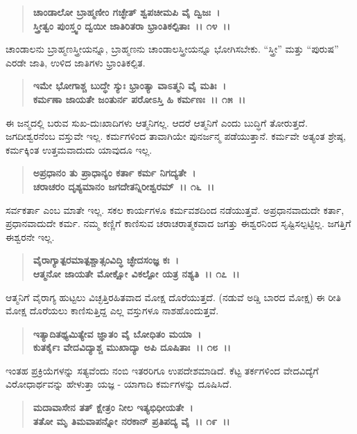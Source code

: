 \begin{verse}
\textbf{ಚಾಂಡಾಲೋ ಬ್ರಾಹ್ಮಣೀಂ ಗಚ್ಛೇತ್ ಶ್ವಪಚೀಮಪಿ ವೈ ದ್ವಿಜಃ~।}\\\textbf{ಸ್ತ್ರೀತ್ವಂ ಪುಂಸ್ತ್ವಂ ದ್ವಯೀ ಜಾತಿರಿತರಾ ಭ್ರಾಂತಿಕಲ್ಪಿತಾಃ~।। ೧೪~।।}
\end{verse}

ಚಾಂಡಾಲನು ಬ್ರಾಹ್ಮಣಸ್ತ್ರೀಯನ್ನೂ, ಬ್ರಾಹ್ಮಣನು ಚಾಂಡಾಲಸ್ತ್ರೀಯನ್ನೂ ಭೋಗಿಸಬೇಕು. “ಸ್ತ್ರೀ” ಮತ್ತು “ಪುರುಷ” ಎರಡೇ ಜಾತಿ, ಉಳಿದ ಜಾತಿಗಳು ಭ್ರಾಂತಿಕಲ್ಪಿತ.

\begin{verse}
\textbf{ಇಮೇ ಭೋಗಾಶ್ಚ ಬುದ್ಧೇ ಸ್ಯುಃ ಭ್ರಾಂತ್ಯಾ ವಾಽತ್ಮನಿ ವೈ ಮತಿಃ~।}\\\textbf{ಕರ್ಮಣಾ ಜಾಯತೇ ಜಂತುರ್ನ ಪರೋಽಸ್ತಿ ಹಿ ಕರ್ಮಣಃ~।। ೧೫~।।}
\end{verse}

ಈ ಜನ್ಮದಲ್ಲಿ ಬರುವ ಸುಖ-ದುಃಖಾದಿಗಳು ಆತ್ಮನಿಗಲ್ಲ. ಆದರೆ ಆತ್ಮನಿಗೆ ಎಂದು ಬುದ್ಧಿಗೆ ತೋರುತ್ತದೆ. ಜಗದೀಶ್ವರನೆಂಬ ವಸ್ತುವೇ ಇಲ್ಲ. ಕರ್ಮಗಳಿಂದ ತಾವಾಗಿಯೇ ಪುನರ್ಜನ್ಮ ಪಡೆಯುತ್ತಾನೆ. ಕರ್ಮವೇ ಅತ್ಯಂತ ಶ್ರೇಷ್ಠ, ಕರ್ಮಕ್ಕಿಂತ ಉತ್ತಮವಾದುದು ಯಾವುದೂ ಇಲ್ಲ.

\begin{verse}
\textbf{ಅಪ್ರಧಾನಂ ತು ಪ್ರಾಧಾನ್ಯಂ ಕರ್ತಾ ಕರ್ಮ ನಿಗದ್ಯತೇ~।}\\\textbf{ಚರಾಚರಂ ದೃಶ್ಯಮಾನಂ ಜಗದೇತನ್ನಿರೀಶ್ವರಮ್~।। ೧೬~।।}
\end{verse}

ಸರ್ವಕರ್ತಾ ಎಂಬ ಮಾತೇ ಇಲ್ಲ. ಸಕಲ ಕಾರ್ಯಗಳೂ ಕರ್ಮವಶದಿಂದ ನಡೆಯುತ್ತವೆ. ಅಪ್ರಧಾನವಾದುದೇ ಕರ್ತಾ, ಪ್ರಧಾನವಾದುದೇ ಕರ್ಮ. ನಮ್ಮ ಕಣ್ಣಿಗೆ ಕಾಣಿಸುವ ಚರಾಚರಾತ್ಮಕವಾದ ಜಗತ್ತು ಈಶ್ವರನಿಂದ ಸೃಷ್ಟಿಸಲ್ಪಟ್ಟಿಲ್ಲ. ಜಗತ್ತಿಗೆ ಈಶ್ವರನೇ ಇಲ್ಲ.

\begin{verse}
\textbf{ವೈರಾಗ್ಯಾತ್ಪರಮಾತ್ಪಶ್ಚಾತ್ಸಂವಿದ್ಧಿ ಚ್ಛೇದಸಂಜ್ಞ ಕಃ~।}\\\textbf{ಆತ್ಮನೋ ಜಾಯತೇ ಮೋಕ್ಷೋ ವಿಕಲ್ಪೋ ಯತ್ರ ನಶ್ಯತಿ~।। ೧೭~।।}
\end{verse}

ಆತ್ಮನಿಗೆ ವೈರಾಗ್ಯ ಹುಟ್ಟಲು ವಿಚ್ಛತ್ತಿರಹಿತವಾದ ಮೋಕ್ಷ ದೊರೆಯುತ್ತದೆ. (ನಡುವೆ ಅಡ್ಡಿ ಬಾರದ  ಮೋಕ್ಷ) ಈ ರೀತಿ ಮೋಕ್ಷ ದೊರೆಯಲು ಕಾಣಿಸುತ್ತಿದ್ದ ಎಲ್ಲ ವಸ್ತುಗಳೂ ನಾಶಹೊಂದುತ್ತವೆ.

\begin{verse}
\textbf{ಇತ್ಯಾದಿತಥ್ಯಮಿತ್ಯೇವ ಜ್ಞಾತಂ ವೈ ಬೋಧಿತಂ ಮಯಾ~।}\\\textbf{ಕುತರ್ಕೈಃ ವೇದವಿದ್ಯಾಶ್ಚ ಮುಖಾದ್ಯಾ ಅಪಿ ದೂಷಿತಾಃ~।। ೧೮~।।}
\end{verse}

ಇಂತಹ ಪ್ರಕ್ರಿಯೆಗಳನ್ನು ಸತ್ಯವೆಂದು ನಂಬಿ ಇತರರಿಗೂ ಉಪದೇಶಮಾಡಿದೆ. ಕೆಟ್ಟ ತರ್ಕಗಳಿಂದ ವೇದವಿದ್ಯೆಗೆ ವಿರೋಧಾರ್ಥವನ್ನು ಹೇಳುತ್ತಾ ಯಜ್ಞ - ಯಾಗಾದಿ ಕರ್ಮಗಳನ್ನು ದೂಷಿಸಿದೆ.

\begin{verse}
\textbf{ಮದಾವಾಸೇನ ತತ್ ಕ್ಷೇತ್ರಂ ನೀಲ ಇತ್ಯಭಿಧೀಯತೇ~।}\\\textbf{ತತೋ ಮೃ ತಿಮವಾಪನ್ನೋ ನರಕಾನ್ ಪ್ರತಿಪದ್ಯ ವೈ~।। ೧೯~।। }
\end{verse}

